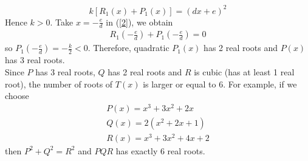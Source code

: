 \documentclass{article}
\begin{document}
\begin{equation}
	\label{2}
	k\left[ {{R_1}\left( x \right) + {P_1}\left( x \right)} \right] = {\left( {dx + e} \right)^2}
\end{equation}
Hence $k>0$. Take $x =  - \frac{e}{d}$ in (\ref{2}), we obtain
\begin{align}
	{R_1}\left( { - \frac{e}{d}} \right) + {P_1}\left( { - \frac{e}{d}} \right) = 0
\end{align}
so ${P_1}\left( { - \frac{e}{d}} \right) =  - \frac{k}{2} < 0$. Therefore, quadratic $P_1(x)$ has 2 real roots and $P(x)$ has 3 real roots.\\
Since $P$ has 3 real roots, $Q$ has 2 real roots and $R$ is cubic (has at least 1 real root), the number of roots of $T(x)$ is larger or equal to 6. For example, if we choose
\begin{align}
	P\left( x \right) = {x^3} + 3{x^2} + 2x\\
	Q\left( x \right) = 2\left( {{x^2} + 2x + 1} \right)\\
	R\left( x \right) = {x^3} + 3{x^2} + 4x + 2
\end{align}
then $P^2+Q^2=R^2$ and $PQR$ has exactly 6 real roots.
\end{document}
